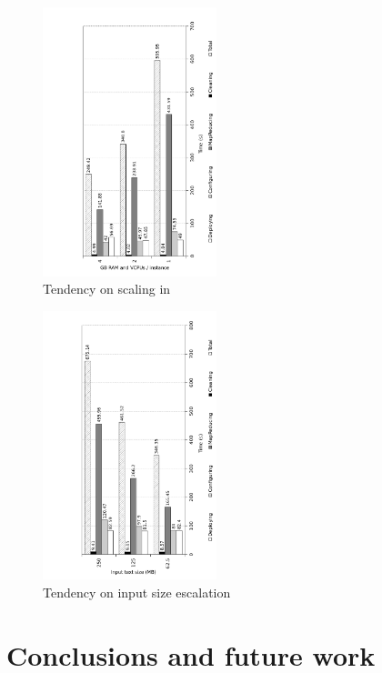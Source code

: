 \documentclass{sig-alternate}
\begin{document}
\begin{figure}[tbp]
\centering
\includegraphics[width=0.45\textwidth]{img/008}
\caption{Tendency on scaling in}
\label{fig:scalein}
\end{figure}

\begin{figure}[tbp]
\centering
\includegraphics[width=0.45\textwidth]{img/009}
\caption{Tendency on input size escalation}
\label{fig:inputscale}
\end{figure}

\section{Conclusions and future work}\label{sec:conclusions}
\noindent

\nocite{*}
\end{document}
